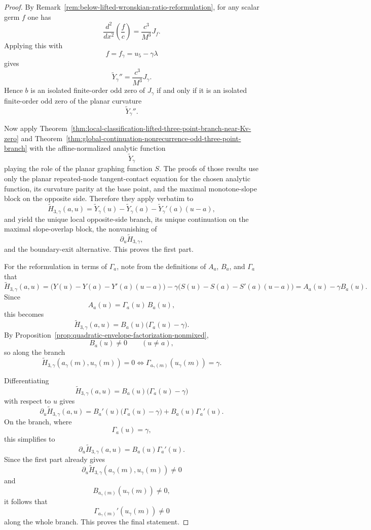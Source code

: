 \documentclass[11pt,a4paper]{amsart}
\theoremstyle{plain}
\theoremstyle{definition}
\begin{document}
\begin{proof}
By Remark~\ref{rem:below-lifted-wronskian-ratio-reformulation}, for any scalar
germ $f$ one has
\[
\frac{d^2}{dx^2}\!\left(\frac{f}{c}\right)=\frac{c^3}{M^3}J_f.
\]
Applying this with
\[
f=f_\gamma=u_5-\gamma\lambda
\]
gives
\[
\widetilde Y_\gamma''=\frac{c^3}{M^3}J_\gamma.
\]
Hence $b$ is an isolated finite-order odd zero of $J_\gamma$ if and only if it
is an isolated finite-order odd zero of the planar curvature
\[
\widetilde Y_\gamma''.
\]

Now apply
Theorem~\ref{thm:local-classification-lifted-three-point-branch-near-Kv-zero}
and
Theorem~\ref{thm:global-continuation-nonrecurrence-odd-three-point-branch}
with the affine-normalized analytic function
\[
\widetilde Y_\gamma
\]
playing the role of the planar graphing function $S$. The proofs of those
results use only the planar repeated-node tangent-contact equation for the
chosen analytic function, its curvature parity at the base point, and the
maximal monotone-slope block on the opposite side. Therefore they apply
verbatim to
\[
\widetilde H_{3,\gamma}(a,u)
=
\widetilde Y_\gamma(u)-\widetilde Y_\gamma(a)-\widetilde Y_\gamma'(a)(u-a),
\]
and yield the unique local opposite-side branch, its unique continuation on the
maximal slope-overlap block, the nonvanishing of
\[
\partial_u\widetilde H_{3,\gamma},
\]
and the boundary-exit alternative. This proves the first part.

For the reformulation in terms of $\Gamma_a$, note from the definitions of
$A_a$, $B_a$, and $\Gamma_a$ that
\[
\widetilde H_{3,\gamma}(a,u)
=
\bigl(Y(u)-Y(a)-Y'(a)(u-a)\bigr)
-\gamma\bigl(S(u)-S(a)-S'(a)(u-a)\bigr)
=
A_a(u)-\gamma B_a(u).
\]
Since
\[
A_a(u)=\Gamma_a(u)\,B_a(u),
\]
this becomes
\[
\widetilde H_{3,\gamma}(a,u)
=
B_a(u)\bigl(\Gamma_a(u)-\gamma\bigr).
\]
By Proposition~\ref{prop:quadratic-envelope-factorization-nonmixed},
\[
B_a(u)\neq 0
\qquad (u\neq a),
\]
so along the branch
\[
\widetilde H_{3,\gamma}(a_\gamma(m),u_\gamma(m))=0
\iff
\Gamma_{a_\gamma(m)}(u_\gamma(m))=\gamma.
\]

Differentiating
\[
\widetilde H_{3,\gamma}(a,u)=B_a(u)\bigl(\Gamma_a(u)-\gamma\bigr)
\]
with respect to $u$ gives
\[
\partial_u\widetilde H_{3,\gamma}(a,u)
=
B_a'(u)\bigl(\Gamma_a(u)-\gamma\bigr)+B_a(u)\Gamma_a'(u).
\]
On the branch, where
\[
\Gamma_a(u)=\gamma,
\]
this simplifies to
\[
\partial_u\widetilde H_{3,\gamma}(a,u)=B_a(u)\Gamma_a'(u).
\]
Since the first part already gives
\[
\partial_u\widetilde H_{3,\gamma}(a_\gamma(m),u_\gamma(m))\neq 0
\]
and
\[
B_{a_\gamma(m)}(u_\gamma(m))\neq 0,
\]
it follows that
\[
\Gamma_{a_\gamma(m)}'(u_\gamma(m))\neq 0
\]
along the whole branch. This proves the final statement.
\end{proof}
\end{document}
